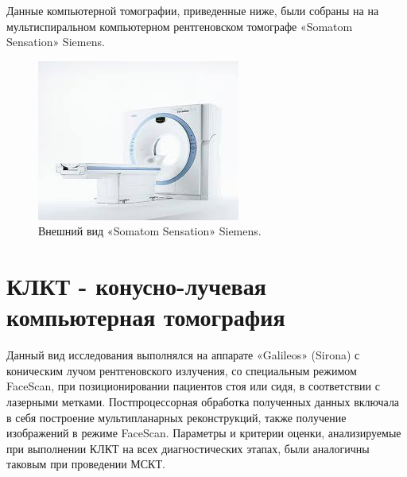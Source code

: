 \documentclass[11pt]{article}
\begin{document}
	Данные компьютерной томографии, приведенные ниже, были собраны на на мультиспиральном компьютерном рентгеновском томографе «Somatom Sensation» Siemens.
	
\begin{figure}[H]
	\centering
	\includegraphics[width=\textwidth]{mskt6}
	\caption{Внешний вид «Somatom Sensation» Siemens. }
	\label{fig:mskt6}
\end{figure} 


	\section{ КЛКТ - конусно-лучевая компьютерная томография}
	Данный вид исследования	выполнялся на аппарате «Galileos» (Sirona) с коническим лучом рентгеновского излучения, со
	специальным режимом FaceScan, при позиционировании пациентов стоя или сидя, в соответствии с лазерными метками. Постпроцессорная	обработка полученных данных включала в себя	построение мультипланарных  реконструкций, также получение изображений в режиме FaceScan. Параметры и критерии оценки, анализируемые при выполнении КЛКТ на всех диагностических этапах, были аналогичны таковым при проведении МСКТ. 
	
\end{document}
